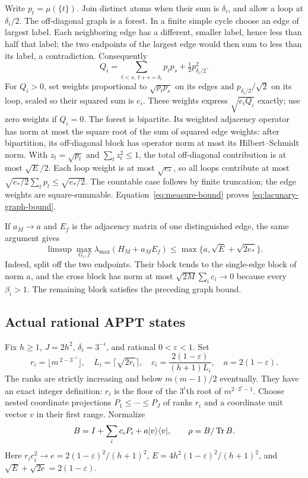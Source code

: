 Write $p_t=\mu(\{t\})$. Join distinct atoms when their sum is
$\delta_i$, and allow a loop at $\delta_i/2$. The off-diagonal graph
is a forest. In a finite simple cycle choose an edge of largest
label. Each neighboring edge has a different, smaller label,
hence less than half that label; the two endpoints of the largest
edge would then sum to less than its label, a contradiction.
Consequently
\[
 Q_i=\sum_{t<s,\ t+s=\delta_i}p_tp_s+\tfrac12p_{\delta_i/2}^2.
\]
For $Q_i>0$, set weights proportional to
$\sqrt{p_tp_s}$ on its edges and $p_{\delta_i/2}/\sqrt2$ on its loop,
scaled so their squared sum is $e_i$. These weights express
$\sqrt{e_iQ_i}$ exactly; use zero weights if $Q_i=0$.
The forest is bipartite. Its weighted adjacency operator has norm
at most the square root of the sum of squared edge weights:
after bipartition, its off-diagonal block has operator norm at most
its Hilbert--Schmidt norm. With $z_t=\sqrt{p_t}$ and $\sum_tz_t^2\leq1$,
the total off-diagonal contribution is at most $\sqrt E/2$.
Each loop weight is at most $\sqrt{e_*}$, so all loops contribute
at most $\sqrt{e_*/2}\sum_t p_t\leq\sqrt{e_*/2}$.
The countable case follows by finite truncation; the edge weights
are square-summable. Equation~\eqref{eq:measure-bound} proves
\eqref{eq:lacunary-graph-bound}.

If $a_M\to a$ and $E_f$ is the adjacency matrix of one distinguished
edge, the same argument gives
\begin{equation}\label{eq:isolated-spike}
 \limsup\max_{G_i,f}\lambda_{\max}(H_M+a_ME_f)
 \leq\max\{a,\sqrt E+\sqrt{2e_*}\}.
\end{equation}
Indeed, split off the two endpoints. Their block tends to the
single-edge block of norm $a$, and the cross block has norm at most
$\sqrt{2M}\sum_i c_i\to0$ because every $\beta_i>1$.
The remaining block satisfies the preceding graph bound.

\subsection{Actual rational APPT states}
Fix $h\geq1$, $J=2h^2$, $\delta_i=3^{-i}$, and rational
$0<\varepsilon<1$. Set
\[
 r_i=\lfloor m^{\,2-3^{-i}}\rfloor,\quad
 L_i=\lceil\sqrt{2r_i}\rceil,\quad
 c_i=\frac{2(1-\varepsilon)}{(h+1)L_i},\quad a=2(1-\varepsilon).
\]
The ranks are strictly increasing and below $m(m-1)/2$ eventually.
They have an exact integer definition: $r_i$ is the floor of the
$3^i$th root of $m^{2\cdot3^i-1}$.
Choose nested coordinate projections $P_1\leq\cdots\leq P_J$ of
ranks $r_i$ and a coordinate unit vector $v$ in their first range.
Normalize
\[
 B=I+\sum_i c_iP_i+a|v\rangle\langle v|,\qquad \rho=B/\operatorname{Tr} B.
\]
Here $r_i c_i^2\to e=2(1-\varepsilon)^2/(h+1)^2$,
$E=4h^2(1-\varepsilon)^2/(h+1)^2$, and
$\sqrt E+\sqrt{2e}=2(1-\varepsilon)$.

